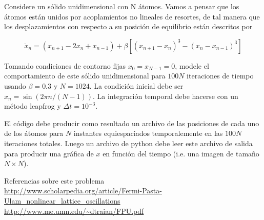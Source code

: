 \documentclass[11pt,letterpaper]{exam}
\begin{document}
\begin{questions}

Considere un s\'olido unidimensional con N \'atomos.
Vamos a pensar que los \'atomos est\'an unidos por acoplamientos no
lineales de resortes, de tal manera que los desplazamientos con respecto
a su posici\'on de equilibrio est\'an descritos por

\begin{equation}
\ddot{x}_n = (x_{n+1} - 2x_n + x_{n-1}) + \beta[(x_{n+1}-x_n)^3 - (x_n - x_{n-1})^3]
\end{equation}

Tomando condiciones de contorno fijas $x_{0}=x_{N-1}=0$, modele el comportamiento
de este s\'olido unidimensional para $100N$ iteraciones de tiempo
usando $\beta=0.3$ y $N=1024$. La condici\'on inicial debe ser
$x_n = \sin(2\pi n/(N-1))$. La integraci\'on
temporal debe hacerse con un m\'etodo leapfrog y $\Delta t=10^{-3}$.

El c\'odigo debe producir como resultado un archivo de las posiciones
de cada uno de los \'atomos para $N$ instantes equiespaciados
temporalemente en las $100N$ iteraciones totales.
Luego un archivo de python debe leer este archivo de salida para
producir una gr\'afica de $x$ en funci\'on del tiempo (i.e. una imagen
de tama\~no $N\times N$). 

Referencias sobre este problema\\
\url{http://www.scholarpedia.org/article/Fermi-Pasta-Ulam_nonlinear_lattice_oscillations}\\
\url{http://www.me.umn.edu/~dtraian/FPU.pdf}\\
\end{questions}
\end{document}
